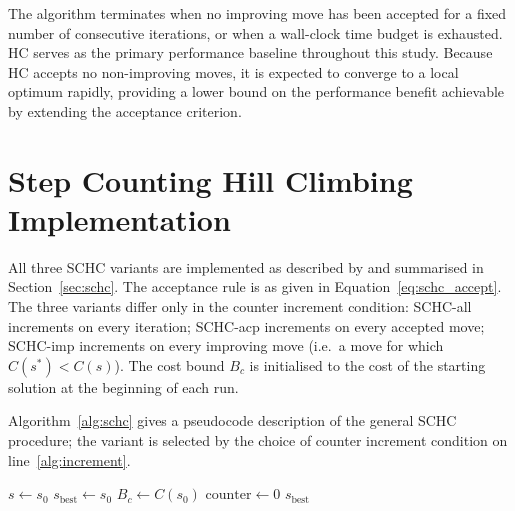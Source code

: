 \documentclass[12pt, a4paper, oneside]{report}
\begin{document}
The algorithm terminates when no improving move has been accepted for
a fixed number of consecutive iterations, or when a wall-clock time
budget is exhausted. HC serves as the primary performance baseline
throughout this study. Because HC accepts no non-improving moves, it
is expected to converge to a local optimum rapidly, providing a lower
bound on the performance benefit achievable by extending the
acceptance criterion.

\section{Step Counting Hill Climbing Implementation}
\label{sec:schc_impl}

All three SCHC variants are implemented as described by
\citet{Bykov2016} and summarised in Section~\ref{sec:schc}. The
acceptance rule is as given in Equation~\ref{eq:schc_accept}. The
three variants differ only in the counter increment condition:
SCHC-all increments on every iteration; SCHC-acp increments on every
accepted move; SCHC-imp increments on every improving move (i.e.\ a
move for which $C(s^*) < C(s)$). The cost bound $B_c$ is initialised
to the cost of the starting solution at the beginning of each run.

Algorithm~\ref{alg:schc} gives a pseudocode description of the
general SCHC procedure; the variant is selected by the choice of
counter increment condition on line~\ref{alg:increment}.

\begin{algorithm}[H]
\caption{Step Counting Hill Climbing (SCHC)}
\label{alg:schc}
\SetAlgoLined
{}
$s \leftarrow s_0$ \;
$s_{\text{best}} \leftarrow s_0$ \;
$B_c \leftarrow C(s_0)$ \;
$\text{counter} \leftarrow 0$ \;
\Return $s_{\text{best}}$
\end{algorithm}
\end{document}
